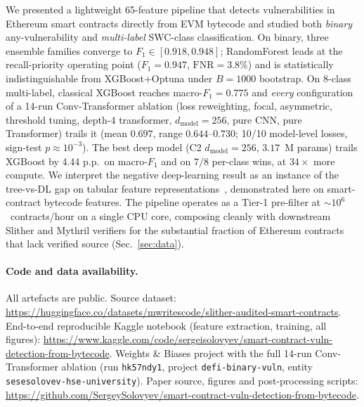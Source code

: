 \documentclass[twocolumn, 10pt]{article}
\begin{document}
We presented a lightweight 65-feature pipeline that detects
vulnerabilities in Ethereum smart contracts directly from EVM
bytecode and studied both \emph{binary} any-vulnerability and
\emph{multi-label} SWC-class classification. On binary, three
ensemble families converge to $F_1\!\in\![0.918,0.948]$;
RandomForest leads at the recall-priority operating point
($F_1\!=\!0.947$, $\mathrm{FNR}\!=\!3.8\%$) and is statistically
indistinguishable from XGBoost+Optuna under $B\!=\!1000$ bootstrap.
On 8-class multi-label, classical XGBoost reaches macro-$F_1\!=\!0.775$
and \emph{every} configuration of a 14-run Conv-Transformer ablation
(loss reweighting, focal, asymmetric, threshold tuning, depth-4
transformer, $d_\text{model}\!=\!256$, pure CNN, pure Transformer)
trails it (mean $0.697$, range $0.644$--$0.730$; 10/10 model-level
losses, sign-test $p\!\approx\!10^{-3}$). The best deep model
(C2 $d_\text{model}\!=\!256$, $3.17$~M params) trails XGBoost by
4.44 p.p.\ on macro-$F_1$ and on $7/8$ per-class wins, at $34\times$ more compute. We
interpret the negative deep-learning result as an instance of the
tree-vs-DL gap on tabular feature
representations~\cite{grinsztajn2022,shwartz2022}, demonstrated
here on smart-contract bytecode features. The pipeline
operates as a Tier-1 pre-filter at $\sim\!10^{6}$~contracts/hour on
a single CPU core, composing cleanly with downstream Slither and
Mythril verifiers for the substantial fraction of Ethereum
contracts that lack verified source (Sec.~\ref{sec:data}).

\paragraph{Code and data availability.}
All artefacts are public. Source dataset:
\url{https://huggingface.co/datasets/mwritescode/slither-audited-smart-contracts}.
End-to-end reproducible Kaggle notebook (feature extraction,
training, all figures):
\url{https://www.kaggle.com/code/sergeisolovyev/smart-contract-vuln-detection-from-bytecode}.
Weights \& Biases project with the full 14-run Conv-Transformer
ablation (run \texttt{hk57ndy1}, project \texttt{defi-binary-vuln},
entity \texttt{sesesolovev-hse-university}). Paper source, figures
and post-processing scripts:
\url{https://github.com/SergeySolovyev/smart-contract-vuln-detection-from-bytecode}.

{\small

}
\end{document}
